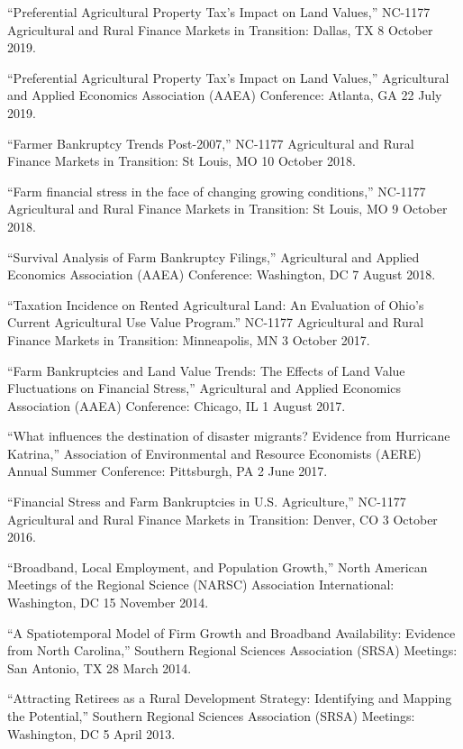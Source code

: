\documentclass[letterpaper]{article}
\renewenvironment{itemize}{
  \begin{list}{}{
    \setlength{\leftmargin}{1.5em}
  }
}{
  \end{list}
}
\begin{document}
\begin{itemize}
\item ``Preferential Agricultural Property Tax's Impact on Land Values,'' NC-1177 Agricultural and Rural Finance Markets in Transition: Dallas, TX 8 October 2019.
\item ``Preferential Agricultural Property Tax's Impact on Land Values,'' Agricultural and Applied Economics Association (AAEA) Conference: Atlanta, GA 22 July 2019.
\item ``Farmer Bankruptcy Trends Post-2007,'' NC-1177 Agricultural and Rural Finance Markets in Transition: St Louis, MO 10 October 2018.
\item ``Farm financial stress in the face of changing growing conditions,'' NC-1177 Agricultural and Rural Finance Markets in Transition: St Louis, MO 9 October 2018.
\item ``Survival Analysis of Farm Bankruptcy Filings,'' Agricultural and Applied Economics Association (AAEA) Conference: Washington, DC 7 August 2018.
\item ``Taxation Incidence on Rented Agricultural Land: An Evaluation of Ohio's Current Agricultural Use Value Program.'' NC-1177 Agricultural and Rural Finance Markets in Transition: Minneapolis, MN 3 October 2017.
\item ``Farm Bankruptcies and Land Value Trends: The Effects of Land Value Fluctuations on Financial Stress,'' Agricultural and Applied Economics Association (AAEA) Conference: Chicago, IL 1 August 2017.
\item ``What influences the destination of disaster migrants? Evidence from Hurricane Katrina,'' Association of Environmental and Resource Economists (AERE) Annual Summer Conference: Pittsburgh, PA 2 June 2017.
\item ``Financial Stress and Farm Bankruptcies in U.S. Agriculture,'' NC-1177 Agricultural and Rural Finance Markets in Transition: Denver, CO 3 October 2016.
\item ``Broadband, Local Employment, and Population Growth,'' North American Meetings of the Regional Science (NARSC) Association International: Washington, DC 15 November 2014.
\item ``A Spatiotemporal Model of Firm Growth and Broadband Availability: Evidence from North Carolina,'' Southern Regional Sciences Association (SRSA) Meetings: San Antonio, TX 28 March 2014.
\item ``Attracting Retirees as a Rural Development Strategy: Identifying and Mapping the Potential,'' Southern Regional Sciences Association (SRSA) Meetings: Washington, DC 5 April 2013.
\end{itemize}
\end{document}
